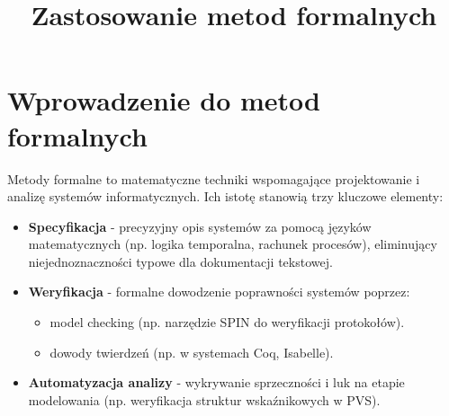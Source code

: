 \documentclass[conference]{IEEEtran}
\begin{document}
    \title{Zastosowanie metod formalnych}

    \author{
       \and
    \and
    \and
    }
    \maketitle

    \section{Wprowadzenie do metod formalnych}
    Metody formalne to matematyczne techniki wspomagające projektowanie i analizę systemów informatycznych. Ich istotę stanowią trzy kluczowe elementy:

        \begin{itemize}
            \item \textbf{Specyfikacja} - precyzyjny opis systemów za pomocą języków matematycznych (np. logika temporalna, rachunek procesów), eliminujący niejednoznaczności typowe dla dokumentacji tekstowej.
            
            \item \textbf{Weryfikacja} - formalne dowodzenie poprawności systemów poprzez:
            \begin{itemize}
                \item model checking (np. narzędzie SPIN do weryfikacji protokołów).
                \item dowody twierdzeń (np. w systemach Coq, Isabelle).
            \end{itemize}
            
            \item \textbf{Automatyzacja analizy} - wykrywanie sprzeczności i luk na etapie modelowania (np. weryfikacja struktur wskaźnikowych w PVS).
        \end{itemize}
\end{document}
